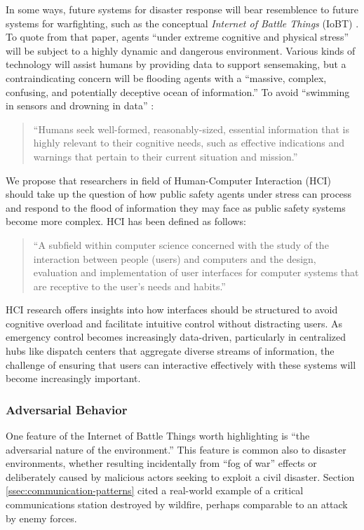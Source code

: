 \documentclass[]             %
{NASA}                       %
\theoremstyle{definition}
\begin{document}
In some ways, future systems for disaster response will bear
resemblence to future systems for warfighting, such as the conceptual
\emph{Internet of Battle Things} (IoBT) \cite{2016:iobt}. To quote
from that paper, agents ``under extreme cognitive and physical
stress'' will be subject to a highly dynamic and dangerous
environment. Various kinds of technology will assist humans by
providing data to support sensemaking, but a contraindicating concern
will be flooding agents with a ``massive, complex, confusing, and
potentially deceptive ocean of information.'' To avoid ``swimming in
sensors and drowning in data'' \cite{2010:magnuson}:
\begin{quote}
``Humans seek well-formed, reasonably-sized, essential information
  that is highly relevant to their cognitive needs, such as effective
  indications and warnings that pertain to their current situation and
  mission.'' \cite{2016:iobt}
\end{quote}

We propose that researchers in field of Human-Computer Interaction
(HCI) should take up the question of how public safety agents under
stress can process and respond to the flood of information they may
face as public safety systems become more complex. HCI has been
defined as follows:
\begin{quote}
  ``A subfield within computer science concerned with the study of the
  interaction between people (users) and computers and the design,
  evaluation and implementation of user interfaces for computer
  systems that are receptive to the user's needs and habits.'' \cite{2009:hci-definition}
\end{quote}
HCI research offers insights into how interfaces should be structured
to avoid cognitive overload and facilitate intuitive control without
distracting users. As emergency control becomes increasingly
data-driven, particularly in centralized hubs like dispatch centers
that aggregate diverse streams of information, the challenge of
ensuring that users can interactive effectively with these systems
will become increasingly important.

\subsubsection{Adversarial Behavior}
One feature of the Internet of Battle Things worth highlighting is
``the adversarial nature of the environment.'' This feature is common
also to disaster environments, whether resulting incidentally from
``fog of war'' effects or deliberately caused by malicious actors
seeking to exploit a civil disaster. Section
\ref{ssec:communication-patterns} cited a real-world example of a
critical communications station destroyed by wildfire, perhaps
comparable to an attack by enemy forces.
\end{document}

